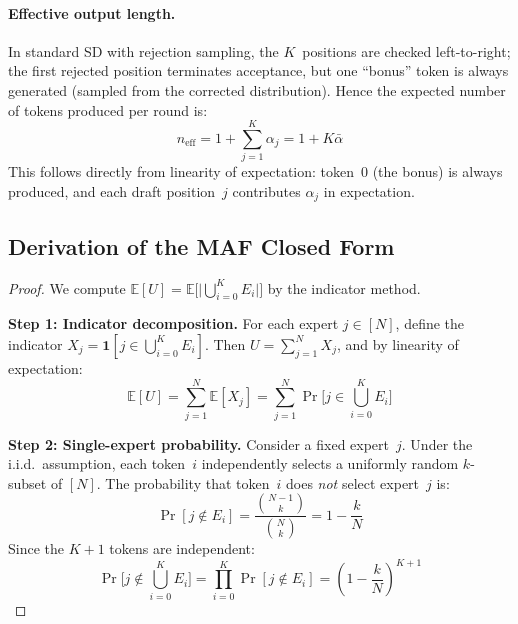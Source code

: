 \documentclass[letterpaper,twocolumn,10pt]{article}
\newcommand{\thetabar}{\bar{\alpha}}
\begin{document}
\begin{appendices}
\paragraph{Effective output length.}
In standard SD with rejection sampling, the $K$~positions are checked
left-to-right; the first rejected position terminates acceptance, but one
``bonus'' token is always generated (sampled from the corrected
distribution).  Hence the expected number of tokens produced per round is:
\begin{equation}\label{eq:neff}
  n_{\text{eff}} = 1 + \sum_{j=1}^{K} \alpha_j = 1 + K\thetabar
\end{equation}
This follows directly from linearity of expectation: token~0 (the bonus)
is always produced, and each draft position~$j$ contributes $\alpha_j$ in
expectation.

\subsection{Derivation of the MAF Closed Form}\label{app:maf-proof}

\begin{proof}
We compute $\mathbb{E}[U] = \mathbb{E}\bigl[\bigl|\bigcup_{i=0}^{K}
E_i\bigr|\bigr]$ by the indicator method.

\textbf{Step 1: Indicator decomposition.}
For each expert $j \in [N]$, define the indicator
$X_j = \mathbf{1}[j \in \bigcup_{i=0}^{K} E_i]$.
Then $U = \sum_{j=1}^{N} X_j$, and by linearity of expectation:
\begin{equation}\label{eq:EU-indicator}
  \mathbb{E}[U]
  = \sum_{j=1}^{N} \mathbb{E}[X_j]
  = \sum_{j=1}^{N} \Pr\!\bigl[j \in \textstyle\bigcup_{i=0}^{K} E_i\bigr]
\end{equation}

\textbf{Step 2: Single-expert probability.}
Consider a fixed expert~$j$.  Under the i.i.d.\ assumption, each token~$i$
independently selects a uniformly random $k$-subset of $[N]$.  The
probability that token~$i$ does \emph{not} select expert~$j$ is:
\begin{equation}\label{eq:miss-prob}
  \Pr[j \notin E_i] = \frac{\binom{N-1}{k}}{\binom{N}{k}} = 1 - \frac{k}{N}
\end{equation}
Since the $K\!+\!1$ tokens are independent:
\begin{equation}\label{eq:all-miss}
  \Pr\!\bigl[j \notin \textstyle\bigcup_{i=0}^{K} E_i\bigr]
  = \prod_{i=0}^{K} \Pr[j \notin E_i]
  = \left(1 - \frac{k}{N}\right)^{K+1}
\end{equation}


\end{proof}
\end{appendices}
\end{document}
